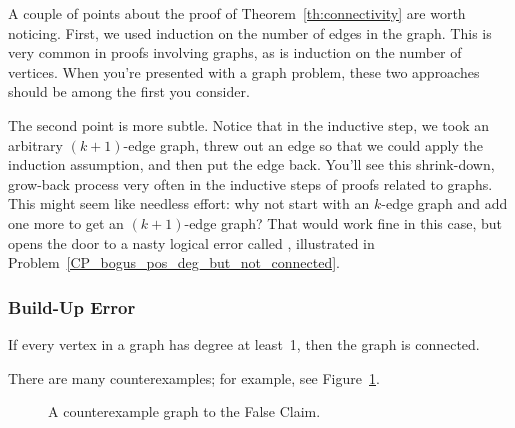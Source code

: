 A couple of points about the proof of Theorem~\ref{th:connectivity}
are worth noticing.  First, we used induction on the number of edges
in the graph.  This is very common in proofs involving graphs, as is
induction on the number of vertices.  When you're presented with a
graph problem, these two approaches should be among the first you
consider.

The second point is more subtle.  Notice that in the inductive step,
we took an arbitrary $(k+1)$-edge graph, threw out an edge so that we
could apply the induction assumption, and then put the edge back.
You'll see this shrink-down, grow-back process very often in the
inductive steps of proofs related to graphs.  This might seem like
needless effort: why not start with an $k$-edge graph and add one more
to get an $(k+1)$-edge graph?  That would work fine in this case, but
opens the door to a nasty logical error called ,
illustrated in Problem~\ref{CP_bogus_pos_deg_but_not_connected}.

\iffalse

\subsubsection{Build-Up Error}

\begin{falseclm*}
If every vertex in a graph has degree at least~1, then the graph is
connected.
\end{falseclm*}

There are many counterexamples; for example, see Figure~\ref{fig:5Z}.

\begin{figure}


\caption{A counterexample graph to the False Claim.}

\label{fig:5Z}
\end{figure}

